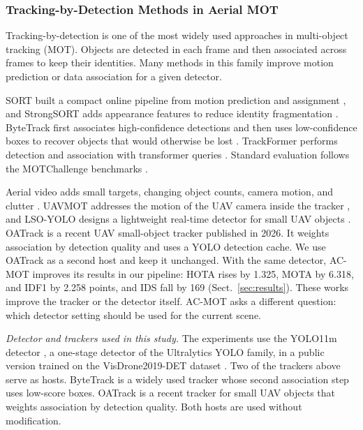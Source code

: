 \documentclass[pdflatex,sn-mathphys-num,iicol]{sn-jnl}
\begin{document}
\subsubsection{Tracking-by-Detection Methods in Aerial MOT}\label{sec:hosts}
Tracking-by-detection is one of the most widely used approaches in multi-object tracking (MOT). Objects are detected in each frame and then associated across frames to keep their identities. Many methods in this family improve motion prediction or data association for a given detector.

SORT built a compact online pipeline from motion prediction and assignment
\cite{bewley2016sort}, and StrongSORT adds appearance features to reduce
identity fragmentation \cite{du2023strongsort}. ByteTrack first associates
high-confidence detections and then uses low-confidence boxes to recover
objects that would otherwise be lost \cite{zhang2022bytetrack}. TrackFormer
performs detection and association with transformer queries
\cite{meinhardt2022trackformer}. Standard evaluation follows the MOTChallenge
benchmarks \cite{dendorfer2021motchallenge}.

Aerial video adds small targets, changing object counts, camera motion, and
clutter \cite{zhu2022visdrone,du2018uavdt}. UAVMOT addresses the motion of the
UAV camera inside the tracker \cite{liu2022uavmot}, and LSO-YOLO designs a
lightweight real-time detector for small UAV objects \cite{dai2026lsoyolo}.
OATrack \cite{qi2026oatrack} is a recent UAV small-object tracker published in
2026. It weights association by detection quality and uses a YOLO detection
cache. We use OATrack as a second host and keep it unchanged. With the same
detector, AC-MOT improves its results in our pipeline: HOTA rises by 1.325,
MOTA by 6.318, and IDF1 by 2.258 points, and IDS fall by 169
(Sect.~\ref{sec:results}). These works improve the tracker or the detector
itself. AC-MOT asks a different question: which detector setting should be
used for the current scene.

\emph{Detector and trackers used in this study.} The experiments use the YOLO11m detector \cite{jocher2024yolo11}, a
one-stage detector of the Ultralytics YOLO family, in a public version trained
on the VisDrone2019-DET dataset \cite{zhu2022visdrone}. Two of the trackers
above serve as hosts. ByteTrack \cite{zhang2022bytetrack} is a widely used
tracker whose second association step uses low-score boxes. OATrack
\cite{qi2026oatrack} is a recent tracker for small UAV objects that weights
association by detection quality. Both hosts are used without modification.
\end{document}
